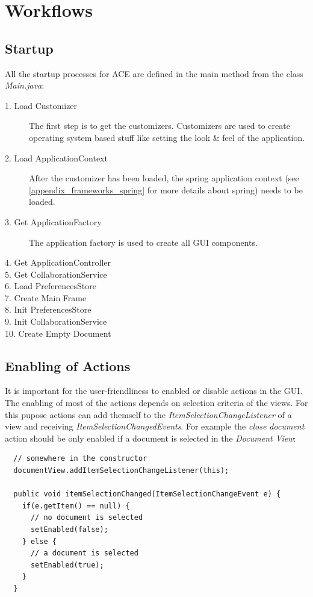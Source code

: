 \newpage
\section{Workflows}

\subsection{Startup}
\label{applicationlayer_wf_startup}
All the startup processes for ACE are defined in the main method from the class \textit{Main.java}:
\begin{description}
\item[1. Load Customizer ] The first step is to get the customizers. Customizers are used to create operating system based stuff like setting the look \& feel of the application.
\item[2. Load ApplicationContext ] After the customizer has been loaded, the spring application context (see \ref{appendix_frameworks_spring} for more details about spring) needs to be loaded.
\item[3. Get ApplicationFactory ] The application factory is used to create all GUI components.
\item[4. Get ApplicationController ]  
\item[5. Get CollaborationService ] 
\item[6. Load PreferencesStore ]
\item[7. Create Main Frame ]
\item[8. Init PreferencesStore ]
\item[9. Init CollaborationService ]
\item[10. Create Empty Document ]
\end{description}

\subsection{Enabling of Actions}
It is important for the user-friendliness to enabled or disable actions in the GUI. The enabling of most of the actions depends on selection criteria of the views. For this pupose actions can add themself to the \textit{ItemSelectionChangeListener} of a view and receiving \textit{ItemSelectionChangedEvents}.  For example the \textit{close document} action should be only enabled if a document is selected in the \textit{Document View}:
\begin{verbatim}
  // somewhere in the constructor
  documentView.addItemSelectionChangeListener(this);

  public void itemSelectionChanged(ItemSelectionChangeEvent e) {
    if(e.getItem() == null) {
      // no document is selected
      setEnabled(false);
    } else {
      // a document is selected
      setEnabled(true);
    }
  }
\end{verbatim}

